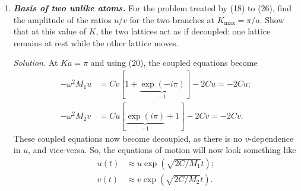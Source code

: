 \documentclass{homework}
\newcommand{\solution}{	\vspace{1em} \textit{Solution.} \quad }
\begin{document}
\begin{enumerate}
\begin{enumerate}
						\solution For the kinetic term, \begin{align*}
							\dot{u}_s & = -\omega \sin(\dots),
							\intertext{As $\expval{\sin[2](\dots)} = 1/2$,}
							\implies \expval{\left(\dot{u}_s\right)^2} & = \frac{ \omega^2 u^2 }{2}. \\
							\implies \expval{T} & = \frac{1}{4} M \omega^2 u^2.
						\end{align*}
						Next, for the potential term,  \begin{align*}
							U_s & = \frac{u}{2} C \left(
								\cos(\omega t - sKa)
								- \cos(\omega t - sKa - Ka)
							\right)^2 \\
							\intertext{I'm not sure how to simplify the difference of cosines, so I'll just assume it'll simplify to the answer given in the question...}
							\expval{U_s} & = \frac{1}{2} C \left(1 - \cos Ka\right) u^2.
							\intertext{Removing the sums (since it's per atom), the time-average total energy per atom is }
							\expval{E} & = \expval{T} + \expval{U} \\
								& = \frac{1}{4} M \omega^2 u^2 + \frac{1}{2} C \left(1 - \cos Ka\right) u^2. \qed
						\end{align*}
				\end{enumerate}
			
		\item %
			\textbf{\textit{Basis of two unlike atoms.}} For the problem treated by (18) to (26), find the amplitude of the ratios $u/v$ for the two branches at $K_\mathrm{max} = \pi / a$. Show that at this value of $K$, the two lattices act as if decoupled: one lattice remains at rest while the other lattice moves.
			
			\solution At $Ka = \pi$ and using (20), the coupled equations become \begin{align*}
				- \omega^2 M_1 u & = Cv \left[1 + \underbrace{ \exp(-i \pi) }_{-1}\right] - 2 Cu = -2Cu ; \\
				- \omega^2 M_2 v & = Cu \left[\underbrace{\exp(i \pi)}_{-1} + 1\right] - 2 Cv = - 2Cv.
			\end{align*}
			These coupled equations now become decoupled, as there is no $v$-dependence in $u$, and vice-versa. So, the equations of motion will now look something like \begin{align*}
				u(t) & \approx u\exp(\sqrt{2C / M_1}t) ;\\
				v(t) & \approx v\exp(\sqrt{2C / M_2}t) .
			\end{align*}
		

\end{enumerate}
\end{document}
